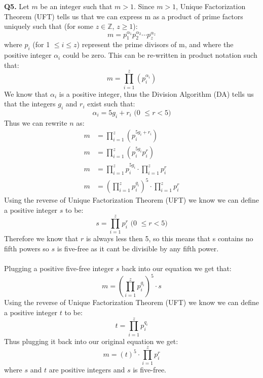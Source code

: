 \documentclass[11pt]{article}
\begin{document}
\parindent=0pt

\textbf{Q5.} Let $m$ be an integer such that $m > 1$. Since $m >1$, Unique Factorization Theorem (UFT) tells us that we can express m as a product of prime factors uniquely such that (for some $z \in \mathbb{Z}$, $z \geq 1$):
\[ m = p_1^{\alpha_1}p_2^{\alpha_2}\cdots p_z^{\alpha_z}  \]
where $p_i$ (for 1 $\leq i \leq z$) represent the prime divisors of m, and where the positive integer $\alpha_i$ could be zero. This can be re-written in product notation such that:
\[ m  = \prod_{i=1}^z(p_i^{\alpha_i}) \]
We know that $\alpha_i$ is a positive integer, thus the Division Algorithm (DA) tells us that the integers $g_i$ and $r_i$ exist such that:
\[ \alpha_i = 5g_i + r_i \text { (0 $\leq r < 5$)}\]
Thus we can rewrite $n$ as:
\begin{align*}
m  &= \prod_{i=1}^z(p_i^{5g_i + r_i}) \\
m  &= \prod_{i=1}^z(p_i^{5g_i}p^r_i)\\
m  &= \prod_{i=1}^zp_i^{5g_i} \cdot \prod_{i=1}^zp^r_i\\
m  &= (\prod_{i=1}^zp_i^{g_i})^5 \cdot \prod_{i=1}^zp^r_i
\end{align*}
Using the reverse of Unique Factorization Theorem (UFT) we know we can define a positive integer $s$ to be:
\[ s = \prod_{i=1}^zp^r_i  \text { (0 $\leq r < 5$)}\]
Therefore we know that $r$ is always less then 5, so this means that s contains no fifth powers so $s$ is five-free as it cant be divisible by any fifth power.\\\\
Plugging a positive five-free integer $s$ back into our equation we get that:
\[ m  = (\prod_{i=1}^zp_i^{g_i})^5 \cdot s\]
Using the reverse of Unique Factorization Theorem (UFT) we know we can define a positive integer $t$ to be:
\[ t = \prod_{i=1}^zp_i^{q_i}  \]
Thus plugging it back into our original equation we get:
\[ m  = (t)^5 \cdot \prod_{i=1}^zp^r_i \]
where $s$ and $t$ are positive integers and $s$ is five-free.
\end{document}
